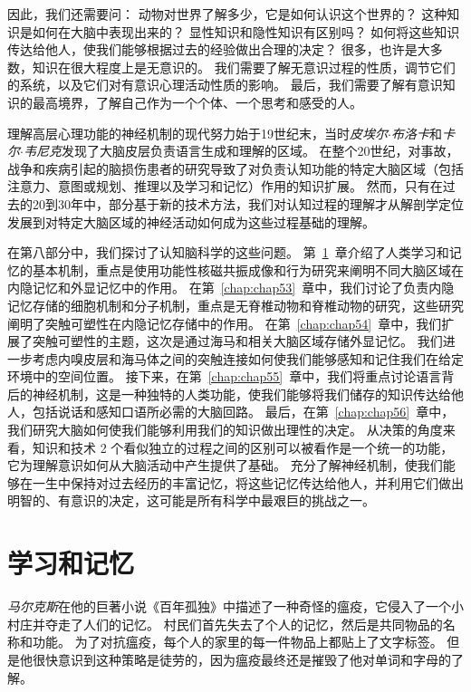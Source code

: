 因此，我们还需要问：
动物对世界了解多少，它是如何认识这个世界的？
这种知识是如何在大脑中表现出来的？
显性知识和隐性知识有区别吗？
如何将这些知识传达给他人，使我们能够根据过去的经验做出合理的决定？
很多，也许是大多数，知识在很大程度上是无意识的。
我们需要了解无意识过程的性质，调节它们的系统，以及它们对有意识心理活动性质的影响。
最后，我们需要了解有意识知识的最高境界，了解自己作为一个个体、一个思考和感受的人。


理解高层心理功能的神经机制的现代努力始于19世纪末，当时\textit{皮埃尔$\cdot$布洛卡}和\textit{卡尔$\cdot$韦尼克}发现了大脑皮层负责语言生成和理解的区域。
在整个20世纪，对事故，战争和疾病引起的脑损伤患者的研究导致了对负责认知功能的特定大脑区域（包括注意力、意图或规划、推理以及学习和记忆）作用的知识扩展。
然而，只有在过去的20到30年中，部分基于新的技术方法，我们对认知过程的理解才从解剖学定位发展到对特定大脑区域的神经活动如何成为这些过程基础的理解。


在第八部分中，我们探讨了认知脑科学的这些问题。
第~\ref{chap:chap52}~章介绍了人类学习和记忆的基本机制，重点是使用功能性核磁共振成像和行为研究来阐明不同大脑区域在内隐记忆和外显记忆中的作用。
在第~\ref{chap:chap53}~章中，我们讨论了负责内隐记忆存储的细胞机制和分子机制，重点是无脊椎动物和脊椎动物的研究，这些研究阐明了突触可塑性在内隐记忆存储中的作用。
在第~\ref{chap:chap54}~章中，我们扩展了突触可塑性的主题，这次是通过海马和相关大脑区域存储外显记忆。
我们进一步考虑内嗅皮层和海马体之间的突触连接如何使我们能够感知和记住我们在给定环境中的空间位置。
接下来，在第~\ref{chap:chap55}~章中，我们将重点讨论语言背后的神经机制，这是一种独特的人类功能，使我们能够将我们储存的知识传达给他人，包括说话和感知口语所必需的大脑回路。
最后，在第~\ref{chap:chap56}~章中，我们研究大脑如何使我们能够利用我们的知识做出理性的决定。
从决策的角度来看，知识和技术 2 个看似独立的过程之间的区别可以被看作是一个统一的功能，它为理解意识如何从大脑活动中产生提供了基础。
充分了解神经机制，使我们能够在一生中保持对过去经历的丰富记忆，将这些记忆传达给他人，并利用它们做出明智的、有意识的决定，这可能是所有科学中最艰巨的挑战之一。



\chapter{学习和记忆} \label{chap:chap52}

\textit{马尔克斯}在他的巨著小说《百年孤独》中描述了一种奇怪的瘟疫，它侵入了一个小村庄并夺走了人们的记忆。
村民们首先失去了个人的记忆，然后是共同物品的名称和功能。
为了对抗瘟疫，每个人的家里的每一件物品上都贴上了文字标签。
但是他很快意识到这种策略是徒劳的，因为瘟疫最终还是摧毁了他对单词和字母的了解。


